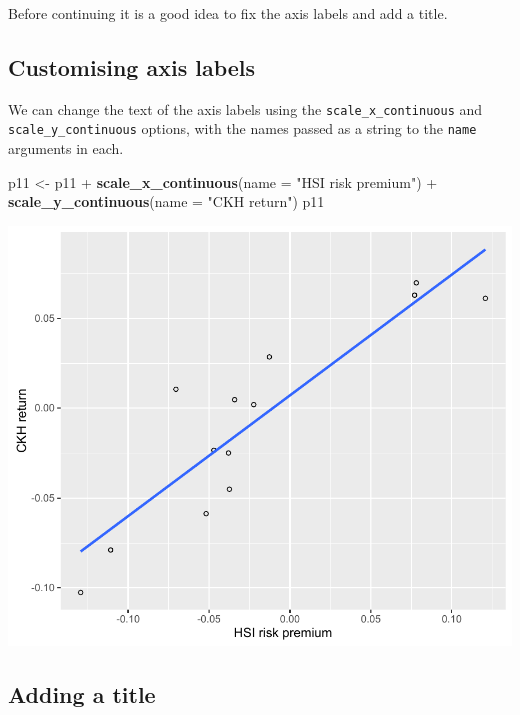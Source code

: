\documentclass[]{article}
\newenvironment{Shaded}{\begin{snugshade}}{\end{snugshade}}
\newcommand{\KeywordTok}[1]{\textcolor[rgb]{0.13,0.29,0.53}{\textbf{{#1}}}}
\newcommand{\DataTypeTok}[1]{\textcolor[rgb]{0.13,0.29,0.53}{{#1}}}
\newcommand{\StringTok}[1]{\textcolor[rgb]{0.31,0.60,0.02}{{#1}}}
\newcommand{\NormalTok}[1]{{#1}}
\begin{document}
Before continuing it is a good idea to fix the axis labels and add a
title.

\subsection{Customising axis labels}\label{customising-axis-labels}

We can change the text of the axis labels using the
\texttt{scale\_x\_continuous} and \texttt{scale\_y\_continuous} options,
with the names passed as a string to the \texttt{name} arguments in
each.

\begin{Shaded}
\begin{Highlighting}[]
\NormalTok{p11 <-}\StringTok{ }\NormalTok{p11 +}\StringTok{ }\KeywordTok{scale_x_continuous}\NormalTok{(}\DataTypeTok{name =} \StringTok{"HSI risk premium"}\NormalTok{) +}\StringTok{ }
\StringTok{  }\KeywordTok{scale_y_continuous}\NormalTok{(}\DataTypeTok{name =} \StringTok{"CKH return"}\NormalTok{)}
\NormalTok{p11}
\end{Highlighting}
\end{Shaded}

\begin{center}\includegraphics{11_Linear_Regression_Plot_pdf/lr_8-1} \end{center}

\subsection{Adding a title}\label{adding-a-title}
\end{document}
